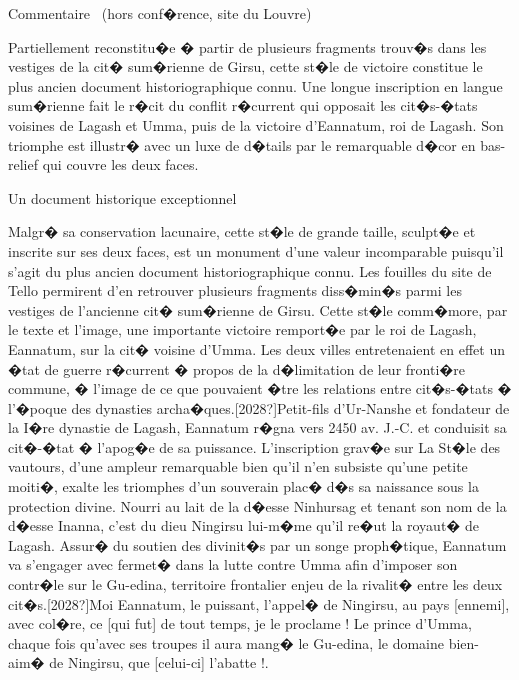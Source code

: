 \documentclass{article}
\begin{document}
\bigskip


\bigskip


\bigskip


\bigskip

Commentaire \ (hors conf�rence, site du Louvre)


\bigskip


\bigskip

Partiellement reconstitu�e � partir de plusieurs fragments trouv�s dans les vestiges de la cit� sum�rienne de Girsu, cette st�le de victoire constitue le plus ancien document historiographique connu. Une longue inscription en langue sum�rienne fait le r�cit du conflit r�current qui opposait les cit�s-�tats voisines de Lagash et Umma, puis de la victoire d'Eannatum, roi de Lagash. Son triomphe est illustr� avec un luxe de d�tails par le remarquable d�cor en bas-relief qui couvre les deux faces.

Un document historique exceptionnel

Malgr� sa conservation lacunaire, cette st�le de grande taille, sculpt�e et inscrite sur ses deux faces, est un monument d'une valeur incomparable puisqu'il s'agit du plus ancien document historiographique connu. Les fouilles du site de Tello permirent d'en retrouver plusieurs fragments diss�min�s parmi les vestiges de l'ancienne cit� sum�rienne de Girsu. Cette st�le comm�more, par le texte et l'image, une importante victoire remport�e par le roi de Lagash, Eannatum, sur la cit� voisine d'Umma. Les deux villes entretenaient en effet un �tat de guerre r�current � propos de la d�limitation de leur fronti�re commune, � l'image de ce que pouvaient �tre les relations entre cit�s-�tats � l'�poque des dynasties archa�ques.[2028?]Petit-fils d'Ur-Nanshe et fondateur de la I�re dynastie de Lagash, Eannatum r�gna vers 2450 av. J.-C. et conduisit sa cit�-�tat � l'apog�e de sa puissance. L'inscription grav�e sur La St�le des vautours, d'une ampleur remarquable bien qu'il n'en subsiste qu'une petite moiti�, exalte les triomphes d'un souverain plac� d�s sa naissance sous la protection divine. Nourri au lait de la d�esse Ninhursag et tenant son nom de la d�esse Inanna, c'est du dieu Ningirsu lui-m�me qu'il re�ut la royaut� de Lagash. Assur� du soutien des divinit�s par un songe proph�tique, Eannatum va s'engager avec fermet� dans la lutte contre Umma afin d'imposer son contr�le sur le Gu-edina, territoire frontalier enjeu de la rivalit� entre les deux cit�s.[2028?]{\textquotedbl}Moi Eannatum, le puissant, l'appel� de Ningirsu, au pays [ennemi], avec col�re, ce [qui fut] de tout temps, je le proclame ! Le prince d'Umma, chaque fois qu'avec ses troupes il aura mang� le Gu-edina, le domaine bien-aim� de Ningirsu, que [celui-ci] l'abatte !{\textquotedbl}.
\end{document}

